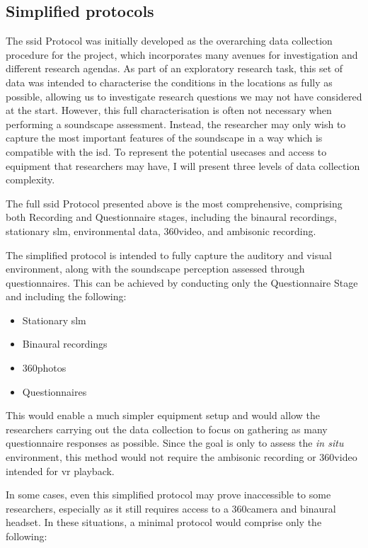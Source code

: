 \subsection{Simplified protocols}

The \gls{ssid} Protocol was initially developed as the overarching data collection procedure for the  project, which incorporates many avenues for investigation and different research agendas. As part of an exploratory research task, this set of data was intended to characterise the conditions in the locations as fully as possible, allowing us to investigate research questions we may not have considered at the start. However, this full characterisation is often not necessary when performing a soundscape assessment. Instead, the researcher may only wish to capture the most important features of the soundscape in a way which is compatible with the \gls{isd}. To represent the potential usecases and access to equipment that researchers may have, I will present three levels of data collection complexity.

The full \gls{ssid} Protocol presented above is the most comprehensive, comprising both Recording and Questionnaire stages, including the binaural recordings, stationary \gls{slm}, environmental data, 360\textdegree video, and ambisonic recording.

The simplified protocol is intended to fully capture the auditory and visual environment, along with the soundscape perception assessed through questionnaires. This can be achieved by conducting only the Questionnaire Stage and including the following:

\begin{itemize}
  \item Stationary \gls{slm}
  \item Binaural recordings
  \item 360\textdegree photos
  \item Questionnaires
\end{itemize}

This would enable a much simpler equipment setup and would allow the researchers carrying out the data collection to focus on gathering as many questionnaire responses as possible. Since the goal is only to assess the \textit{in situ} environment, this method would not require the ambisonic recording or 360\textdegree video intended for \gls{vr} playback.

In some cases, even this simplified protocol may prove inaccessible to some researchers, especially as it still requires access to a 360\textdegree camera and binaural headset. In these situations, a minimal protocol would comprise only the following:

